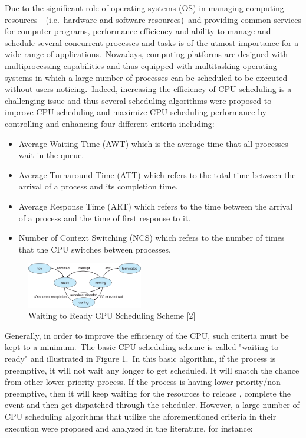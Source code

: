 Due to the significant role of operating systems (OS) in managing
computing resources~\cite{Alsulami2019}~(i.e.~hardware and software
resources)~and providing common services for computer programs, performance
efficiency and ability to manage and schedule several concurrent
processes and tasks is of the utmost importance for a wide range
of applications.~Nowadays, computing platforms are designed with
multiprocessing capabilities and thus equipped with multitasking
operating systems in which a large number of processes can be
scheduled to be executed without users noticing.~Indeed, increasing
the efficiency of CPU scheduling is a challenging issue and thus
several scheduling algorithms were proposed to improve CPU
scheduling and maximize CPU scheduling performance by controlling
and enhancing four different criteria including:

\begin{itemize}
    \item Average Waiting Time (AWT) which is the average time
    that all processes wait in the queue.
    \item Average Turnaround Time (ATT) which refers to the total
    time between the arrival of a process and its completion time.
    \item Average Response Time (ART) which refers to the time
    between the arrival of a process and the time of first
    response to it.
    \item Number of Context Switching (NCS) which refers to the
    number of times that the CPU switches between processes.
\end{itemize}

\begin{figure}[h]
    \centering
    \includegraphics[width=0.45\textwidth]{../figures/figure01}
    \caption{Waiting to Ready CPU Scheduling Scheme [2]}
    \label{fig:fig.waiting-to-ready-cpu-scheduling-scheme-[2]}
\end{figure}

Generally, in order to improve the efficiency of the
CPU, such criteria must be kept to a minimum.~The basic
CPU scheduling scheme is called "waiting to ready" and
illustrated in Figure 1.~In this basic algorithm, if the process
is preemptive, it will not wait any longer to get scheduled.
It will snatch the chance from other lower-priority process.
If the process is having lower priority/non-preemptive, then
it will keep waiting for the resources to release , complete
the event and then get dispatched through the scheduler.
However, a large number of CPU scheduling algorithms that
utilize the aforementioned criteria in their execution were
proposed and analyzed in the literature, for instance:

